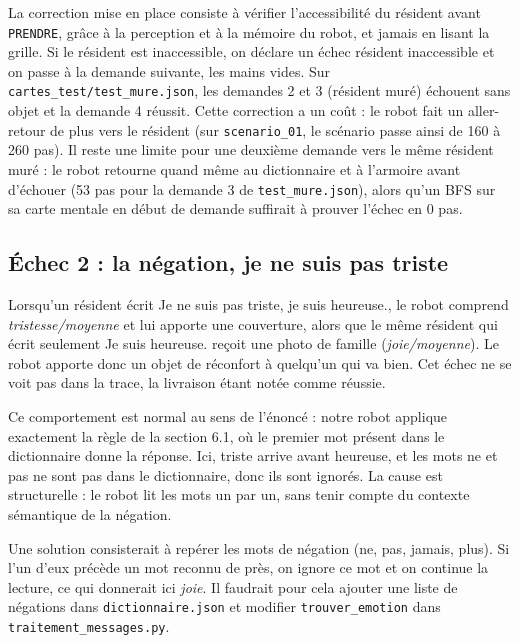 \documentclass[11pt,a4paper]{article}
\begin{document}
La correction mise en place consiste à vérifier l'accessibilité du résident avant \texttt{PRENDRE}, grâce à la perception et à la mémoire du robot, et jamais en lisant la grille. Si le résident est inaccessible, on déclare un échec \og résident inaccessible\fg{} et on passe à la demande suivante, les mains vides. Sur \texttt{cartes\_test/test\_mure.json}, les demandes 2 et 3 (résident muré) échouent sans objet et la demande 4 réussit. Cette correction a un coût : le robot fait un aller-retour de plus vers le résident (sur \texttt{scenario\_01}, le scénario passe ainsi de 160 à 260 pas). Il reste une limite pour une deuxième demande vers le même résident muré : le robot retourne quand même au dictionnaire et à l'armoire avant d'échouer (53 pas pour la demande 3 de \texttt{test\_mure.json}), alors qu'un BFS sur sa carte mentale en début de demande suffirait à prouver l'échec en 0 pas.

\subsection{Échec 2 : la négation, \og je ne suis pas triste\fg{}}
Lorsqu'un résident écrit \og Je ne suis pas triste, je suis heureuse.\fg{}, le robot comprend \emph{tristesse/moyenne} et lui apporte une couverture, alors que le même résident qui écrit seulement \og Je suis heureuse.\fg{} reçoit une photo de famille (\emph{joie/moyenne}). Le robot apporte donc un objet de réconfort à quelqu'un qui va bien. Cet échec ne se voit pas dans la trace, la livraison étant notée comme réussie.

Ce comportement est normal au sens de l'énoncé : notre robot applique exactement la règle de la section 6.1, où le premier mot présent dans le dictionnaire donne la réponse. Ici, \og triste\fg{} arrive avant \og heureuse\fg{}, et les mots \og ne\fg{} et \og pas\fg{} ne sont pas dans le dictionnaire, donc ils sont ignorés. La cause est structurelle : le robot lit les mots un par un, sans tenir compte du contexte sémantique de la négation.

Une solution consisterait à repérer les mots de négation (\og ne\fg{}, \og pas\fg{}, \og jamais\fg{}, \og plus\fg{}). Si l'un d'eux précède un mot reconnu de près, on ignore ce mot et on continue la lecture, ce qui donnerait ici \emph{joie}. Il faudrait pour cela ajouter une liste de négations dans \texttt{dictionnaire.json} et modifier \texttt{trouver\_emotion} dans \texttt{traitement\_messages.py}.
\end{document}
